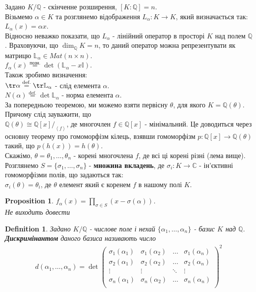 \documentclass[a4paper, 10pt]{article}
\theoremstyle{theoremdd}
\theoremstyle{theoremdd}
\newtheorem{definition}[theorem]{Definition}
\theoremstyle{theoremdd}
\theoremstyle{theoremdd}
\theoremstyle{theoremdd}
\newtheorem{proposition}[theorem]{Proposition}
\theoremstyle{theoremdd}
\theoremstyle{theoremdd}
\theoremstyle{theoremdd}
\begin{document}
Задано $K/\mathbb{Q}$ - скінченне розширення, $[K:\mathbb{Q}]=n$.\\
Візьмемо $\alpha \in K$ та розглянемо відображення $L_\alpha: K \to K$, який визначається так:\\
$L_\alpha (x) = \alpha x$.\\
Відносно неважко показати, що $L_\alpha$ - лінійний оператор в просторі $K$ над полем $\mathbb{Q}$. Враховуючи, що $\dim_\mathbb{Q} K = n$, то даний оператор можна репрезентувати як матрицю $\mathbb{L}_\alpha \in Mat(n \times n)$.\\
$f_\alpha (x) \overset{\text{позн.}}{=} \det (\mathbb{L}_\alpha - x \mathbb{I})$.\\
Також зробимо визначення:\\
$\tr \alpha \overset{\text{def.}}{=} \tr \mathbb{L}_\alpha$ - слід елемента $\alpha$.\\
$N(\alpha) \overset{\text{def.}}{=} \det \mathbb{L}_\alpha$ - норма елемента $\alpha$.
\bigskip \\
За попередньою теоремою, ми можемо взяти первісну $\theta$, для якого $K = \mathbb{Q}(\theta)$. Причому слід зауважити, що\\
$\mathbb{Q}(\theta) \cong \mathbb{Q}[x] /_{ \left<f\right>}$, де многочлен $f \in \mathbb{Q}[x]$ - мінімальний. Це доводиться через основну теорему про гомоморфізм кілець, взявши гомоморфізм $p: \mathbb{Q}[x] \to \mathbb{Q}(\theta)$ такий, що $p(h(x))=h(\theta)$.\\
Скажімо, $\theta = \theta_1,\dots,\theta_n$ - корені многочлена $f$, де всі ці корені різні (лема вище).\\
Розглянемо $S = \{\sigma_1,\dots,\sigma_n\}$ - \textbf{множина вкладень}, де $\sigma_i: K \to \mathbb{C}$ - ін'єктивні гомоморфізми полів, що задаються так:\\
$\sigma_i(\theta) = \theta_i$, де $\theta$ елемент який є коренем $f$ в нашому полі $K$.

\begin{proposition}
$f_\alpha(x) = \displaystyle\prod_{\sigma \in S} (x-\sigma(\alpha))$.\\
\textit{Не виходить довести}
\end{proposition}

\begin{definition}
Задано $K/\mathbb{Q}$ - числове поле і нехай $\{\alpha_1,\dots,\alpha_n\}$ - базис $K$ над $\mathbb{Q}$.\\
\textbf{Дискримінантом} даного базиса називають число
\begin{align*}
d(\alpha_1,\dots,\alpha_n) = \det \begin{pmatrix}
\sigma_1(\alpha_1) & \sigma_1(\alpha_2) & \dots & \sigma_1(\alpha_n) \\
\sigma_2(\alpha_1) & \sigma_2(\alpha_2) & \dots & \sigma_2(\alpha_n) \\
\vdots & \vdots & \ddots & \vdots \\
\sigma_n(\alpha_1) & \sigma_n(\alpha_2) & \dots & \sigma_n(\alpha_n) \\
\end{pmatrix}^2
\end{align*}
\end{definition}
\end{document}

